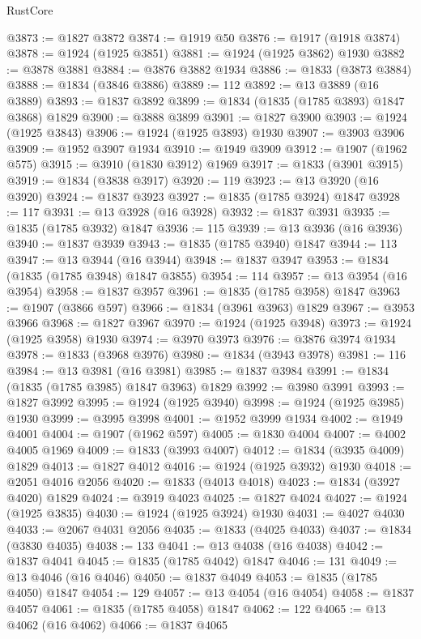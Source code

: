 \begin{lexlean}{RustCore}
\begin{coremodule}
@3873 := @1827 @3872
@3874 := @1919 @50
@3876 := @1917 (@1918 @3874)
@3878 := @1924 (@1925 @3851)
@3881 := @1924 (@1925 @3862) @1930
@3882 := @3878 @3881
@3884 := @3876 @3882 @1934
@3886 := @1833 (@3873 @3884)
@3888 := @1834 (@3846 @3886)
@3889 := 112
@3892 := @13 @3889 (@16 @3889)
@3893 := @1837 @3892
@3899 := @1834 (@1835 (@1785 @3893) @1847 @3868) @1829
@3900 := @3888 @3899
@3901 := @1827 @3900
@3903 := @1924 (@1925 @3843)
@3906 := @1924 (@1925 @3893) @1930
@3907 := @3903 @3906
@3909 := @1952 @3907 @1934
@3910 := @1949 @3909
@3912 := @1907 (@1962 @575)
@3915 := @3910 (@1830 @3912) @1969
@3917 := @1833 (@3901 @3915)
@3919 := @1834 (@3838 @3917)
@3920 := 119
@3923 := @13 @3920 (@16 @3920)
@3924 := @1837 @3923
@3927 := @1835 (@1785 @3924) @1847
@3928 := 117
@3931 := @13 @3928 (@16 @3928)
@3932 := @1837 @3931
@3935 := @1835 (@1785 @3932) @1847
@3936 := 115
@3939 := @13 @3936 (@16 @3936)
@3940 := @1837 @3939
@3943 := @1835 (@1785 @3940) @1847
@3944 := 113
@3947 := @13 @3944 (@16 @3944)
@3948 := @1837 @3947
@3953 := @1834 (@1835 (@1785 @3948) @1847 @3855)
@3954 := 114
@3957 := @13 @3954 (@16 @3954)
@3958 := @1837 @3957
@3961 := @1835 (@1785 @3958) @1847
@3963 := @1907 (@3866 @597)
@3966 := @1834 (@3961 @3963) @1829
@3967 := @3953 @3966
@3968 := @1827 @3967
@3970 := @1924 (@1925 @3948)
@3973 := @1924 (@1925 @3958) @1930
@3974 := @3970 @3973
@3976 := @3876 @3974 @1934
@3978 := @1833 (@3968 @3976)
@3980 := @1834 (@3943 @3978)
@3981 := 116
@3984 := @13 @3981 (@16 @3981)
@3985 := @1837 @3984
@3991 := @1834 (@1835 (@1785 @3985) @1847 @3963) @1829
@3992 := @3980 @3991
@3993 := @1827 @3992
@3995 := @1924 (@1925 @3940)
@3998 := @1924 (@1925 @3985) @1930
@3999 := @3995 @3998
@4001 := @1952 @3999 @1934
@4002 := @1949 @4001
@4004 := @1907 (@1962 @597)
@4005 := @1830 @4004
@4007 := @4002 @4005 @1969
@4009 := @1833 (@3993 @4007)
@4012 := @1834 (@3935 @4009) @1829
@4013 := @1827 @4012
@4016 := @1924 (@1925 @3932) @1930
@4018 := @2051 @4016 @2056
@4020 := @1833 (@4013 @4018)
@4023 := @1834 (@3927 @4020) @1829
@4024 := @3919 @4023
@4025 := @1827 @4024
@4027 := @1924 (@1925 @3835)
@4030 := @1924 (@1925 @3924) @1930
@4031 := @4027 @4030
@4033 := @2067 @4031 @2056
@4035 := @1833 (@4025 @4033)
@4037 := @1834 (@3830 @4035)
@4038 := 133
@4041 := @13 @4038 (@16 @4038)
@4042 := @1837 @4041
@4045 := @1835 (@1785 @4042) @1847
@4046 := 131
@4049 := @13 @4046 (@16 @4046)
@4050 := @1837 @4049
@4053 := @1835 (@1785 @4050) @1847
@4054 := 129
@4057 := @13 @4054 (@16 @4054)
@4058 := @1837 @4057
@4061 := @1835 (@1785 @4058) @1847
@4062 := 122
@4065 := @13 @4062 (@16 @4062)
@4066 := @1837 @4065

\end{coremodule}
\end{lexlean}
